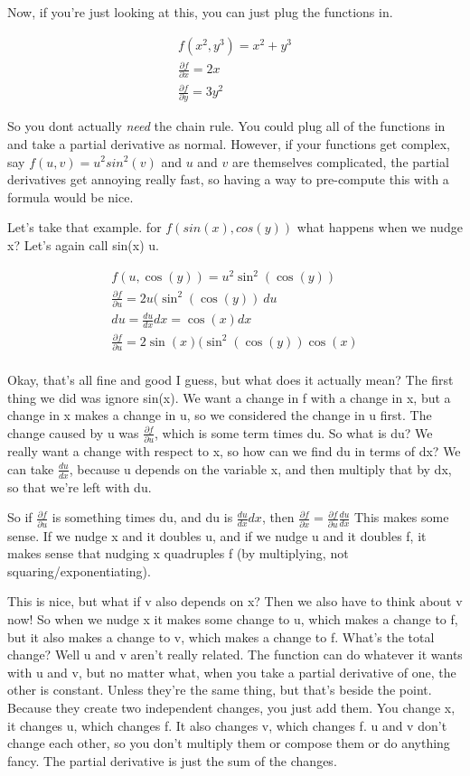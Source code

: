 \documentclass[12pt, letterpaper]{article}
\begin{document}
Now, if you're just looking at this, you can just plug the functions in.

\begin{gather*}
    f(x^2, y^3) = x^2 + y^3\\
    \frac{\partial f}{\partial x} = 2x \\
    \frac{\partial f}{\partial y} = 3y^2
\end{gather*}

So you dont actually \emph{need} the chain rule. You could plug all of the functions in and take a partial derivative as normal.
However, if your functions get complex, say $f(u, v) = u^2sin^2(v)$ and $u$ and $v$ are themselves complicated, the partial derivatives get annoying really fast, so having a way to pre-compute this with a formula would be nice.

Let's take that example. for $f(sin(x), cos(y))$ what happens when we nudge x? Let's again call sin(x) u.

\begin{gather*}
    f(u, \cos(y)) = u^2\sin^2(\cos(y))\\
    \frac{\partial f}{\partial u} = 2u(\sin^2(\cos(y))\ du\\
    du = \frac{du}{dx}dx = \cos(x) dx\\
    \frac{\partial f}{\partial u} = 2\sin(x)(\sin^2(\cos(y))\cos(x)\\
\end{gather*}

Okay, that's all fine and good I guess, but what does it actually mean? The first thing we did was ignore sin(x). We want a change in f with a change in x, but a change in x makes a change in u, so we considered the change in u first.
The change caused by u was $\frac{\partial f}{\partial u}$, which is some term times du. So what is du? We really want a change with respect to x, so how can we find du in terms of dx?
We can take $\frac{du}{dx}$, because u depends on the variable x, and then multiply that by dx, so that we're left with du.

So if $\frac{\partial f}{\partial u}$ is something times du, and du is $\frac{du}{dx} dx$, then $\frac{\partial f}{\partial x} = \frac{\partial f}{\partial u} \frac{du}{dx}$
This makes some sense. If we nudge x and it doubles u, and if we nudge u and it doubles f, it makes sense that nudging x quadruples f (by multiplying, not squaring/exponentiating).

This is nice, but what if v also depends on x? Then we also have to think about v now! So when we nudge x it makes some change to u, which makes a change to f, but it also makes a change to v, which makes a change to f. What's the total change?
Well u and v aren't really related. The function can do whatever it wants with u and v, but no matter what, when you take a partial derivative of one, the other is constant. Unless they're the same thing, but that's beside the point.
Because they create two independent changes, you just add them. You change x, it changes u, which changes f. It also changes v, which changes f. u and v don't change each other, so you don't multiply them or compose them or do anything fancy. The partial derivative is just the sum of the changes.
\end{document}
